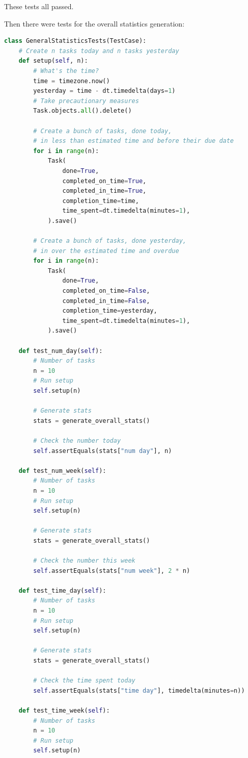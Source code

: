 \documentclass{article}
\begin{document}
These tests all passed.

Then there were tests for the overall statistics generation:
\begin{lstlisting}[language=Python]
class GeneralStatisticsTests(TestCase):
    # Create n tasks today and n tasks yesterday
    def setup(self, n):
        # What's the time?
        time = timezone.now()
        yesterday = time - dt.timedelta(days=1)
        # Take precautionary measures
        Task.objects.all().delete()

        # Create a bunch of tasks, done today,
        # in less than estimated time and before their due date
        for i in range(n):
            Task(
                done=True,
                completed_on_time=True,
                completed_in_time=True,
                completion_time=time,
                time_spent=dt.timedelta(minutes=1),
            ).save()

        # Create a bunch of tasks, done yesterday,
        # in over the estimated time and overdue
        for i in range(n):
            Task(
                done=True,
                completed_on_time=False,
                completed_in_time=False,
                completion_time=yesterday,
                time_spent=dt.timedelta(minutes=1),
            ).save()

    def test_num_day(self):
        # Number of tasks
        n = 10
        # Run setup
        self.setup(n)

        # Generate stats
        stats = generate_overall_stats()

        # Check the number today
        self.assertEquals(stats["num day"], n)

    def test_num_week(self):
        # Number of tasks
        n = 10
        # Run setup
        self.setup(n)

        # Generate stats
        stats = generate_overall_stats()

        # Check the number this week
        self.assertEquals(stats["num week"], 2 * n)

    def test_time_day(self):
        # Number of tasks
        n = 10
        # Run setup
        self.setup(n)

        # Generate stats
        stats = generate_overall_stats()

        # Check the time spent today
        self.assertEquals(stats["time day"], timedelta(minutes=n))

    def test_time_week(self):
        # Number of tasks
        n = 10
        # Run setup
        self.setup(n)


\end{lstlisting}
\end{document}
